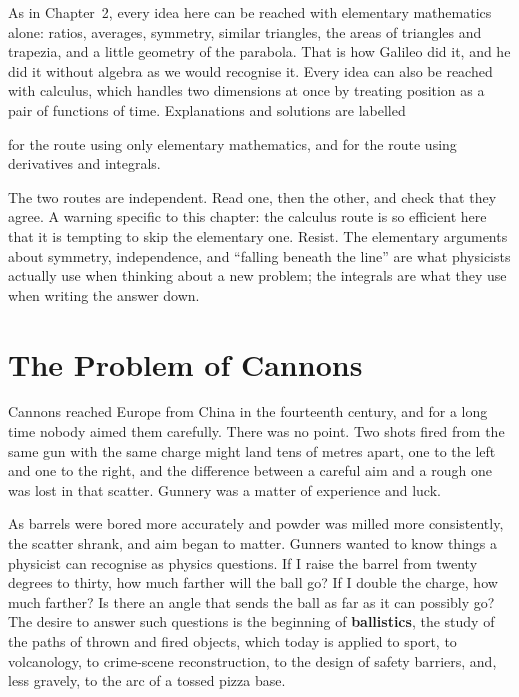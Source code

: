 \documentclass[11pt,twoside,openany]{book}
\newcounter{check}[chapter]
\newcommand{\viewtag}[3]{\fcolorbox{#2}{#3}{\footnotesize\textbf{\textcolor{#2}{#1}}}}
\newcommand{\elemtag}{\viewtag{Elementary}{elemcol}{elempale}}
\newcommand{\calctag}{\viewtag{Calculus}{calccol}{calcpale}}
\begin{document}
\begin{tcolorbox}[enhanced,colback=slatepale,colframe=slate,sharp corners,boxrule=0.6pt,
  title=\textbf{How to read this chapter: two perspectives},coltitle=white,colbacktitle=slate,left=3mm,right=3mm]
As in Chapter~2, every idea here can be reached with elementary mathematics alone: ratios, averages, symmetry, similar triangles, the areas of triangles and trapezia, and a little geometry of the parabola. That is how Galileo did it, and he did it without algebra as we would recognise it. Every idea can also be reached with calculus, which handles two dimensions at once by treating position as a pair of functions of time. Explanations and solutions are labelled
\begin{center}
\elemtag\quad for the route using only elementary mathematics, and \qquad \calctag\quad for the route using derivatives and integrals.
\end{center}
The two routes are independent. Read one, then the other, and check that they agree. A warning specific to this chapter: the calculus route is so efficient here that it is tempting to skip the elementary one. Resist. The elementary arguments about symmetry, independence, and ``falling beneath the line'' are what physicists actually use when thinking about a new problem; the integrals are what they use when writing the answer down.
\end{tcolorbox}

\section{The Problem of Cannons}

Cannons reached Europe from China in the fourteenth century, and for a long time nobody aimed them carefully. There was no point. Two shots fired from the same gun with the same charge might land tens of metres apart, one to the left and one to the right, and the difference between a careful aim and a rough one was lost in that scatter. Gunnery was a matter of experience and luck.

As barrels were bored more accurately and powder was milled more consistently, the scatter shrank, and aim began to matter. Gunners wanted to know things a physicist can recognise as physics questions. If I raise the barrel from twenty degrees to thirty, how much farther will the ball go? If I double the charge, how much farther? Is there an angle that sends the ball as far as it can possibly go? The desire to answer such questions is the beginning of \textbf{ballistics}, the study of the paths of thrown and fired objects, which today is applied to sport, to volcanology, to crime-scene reconstruction, to the design of safety barriers, and, less gravely, to the arc of a tossed pizza base.
\end{document}
